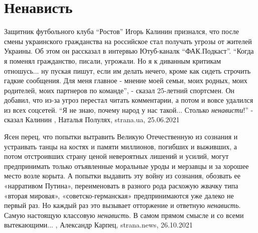  
 
 
 
 
\chapter{Ненависть}
\label{sec:slova.nenavist}

Защитник футбольного клуба \enquote{Ростов} Игорь Калинин признался, что после смены
украинского гражданства на российское стал получать угрозы от жителей Украины.
Об этом он рассказал в интервью Ютуб-каналк \enquote{ФАК.Подкаст}.  \enquote{Когда я поменял
гражданство, писали, угрожали. Но я к диванным критикам отношусь... ну пуская
пишут, если им делать нечего, кроме как сидеть строчить гадкие сообщения. Для
меня главное - мнение моей семьи, моих родных, моих родителей, моих партнеров
по команде}, - сказал 25-летний спортсмен.  Он добавил, что из-за угроз
перестал читать комментарии, а потом и вовсе удалился из всех соцсетей.  \enquote{Я не
знаю, почему народ у нас такой... Столько \emph{ненависти}!} - сказал Калинин
, 
Наталья Полулях, strana.ua, 25.06.2021

Ясен перец, что попытки вытравить Великую Отечественную из сознания и
устраивать танцы на костях и памяти миллионов, погибших и выживших, а потом
отстроивших страну ценой невероятных лишений и усилий, могут предпринимать
только отъявленные моральные уроды и мерзавцы и за хорошее место возле корыта.
А попытки выдавить эту войну из сознания, обозвать ее «нарративом Путина»,
переименовать в разного рода расхожую жвачку типа «вторая мировая»,
«советско-германская» предпринимаются уже далеко не первый раз. Но каждый раз
это вызывает отторжение и ответную \emph{ненависть}. Самую настоящую классовую
\emph{ненависть}. В самом прямом смысле и со всеми вытекающими...
, 
Александр Карпец, strana.news, 26.10.2021

